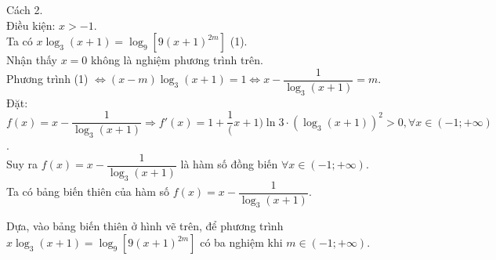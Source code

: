 \begin{ex}
{		Cách 2.\\
		Điều kiện: $x >-1$.\\
		Ta có $x\log_3(x+1)=\log_9\left[9(x+1)^{2m}\right]$ (1).\\
		Nhận thấy $x=0$ không là nghiệm phương trình trên.\\
		Phương trình (1) $\Leftrightarrow(x-m)\log_3(x+1)=1\Leftrightarrow x-\dfrac{1}{\log_3(x+1)}=m$.\\
		Đặt: $f(x)=x-\dfrac{1}{\log_3(x+1)}\Rightarrow f'(x)=1+\dfrac{1}(x+1)\ln 3\cdot{\left(\log_3(x+1)\right)^2}>0,\forall x\in(-1;+\infty)$.\\
		Suy ra $f(x)=x-\dfrac{1}{\log_3(x+1)}$ là hàm số đồng biến $\forall x\in(-1;+\infty)$.\\
		Ta có bảng biến thiên của hàm số $f(x)=x-\dfrac{1}{\log_3(x+1)}$.
		\begin{center}
		\end{center}
		Dựa, vào bảng biến thiên ở hình vẽ trên, để phương trình $x\log_3(x+1)=\log_9\left[9(x+1)^{2m}\right]$ có ba nghiệm khi $m\in(-1;+\infty)$.
	}
\end{ex}
